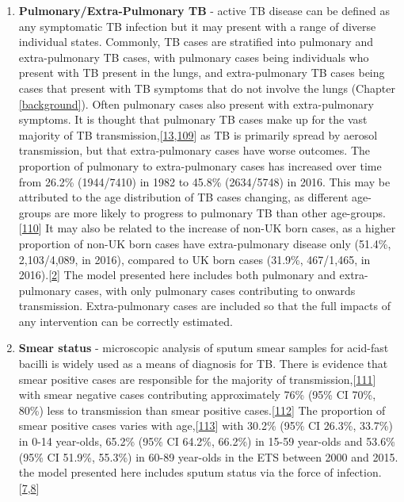 \documentclass[11pt,twoside]{bristolthesis}
\begin{document}
  \begin{enumerate}
  \def\labelenumi{\arabic{enumi}.}
  \item
    \textbf{Pulmonary/Extra-Pulmonary TB} - active TB disease can be defined as any symptomatic TB infection but it may present with a range of diverse individual states. Commonly, TB cases are stratified into pulmonary and extra-pulmonary TB cases, with pulmonary cases being individuals who present with TB present in the lungs, and extra-pulmonary TB cases being cases that present with TB symptoms that do not involve the lungs (Chapter \ref{background}). Often pulmonary cases also present with extra-pulmonary symptoms. It is thought that pulmonary TB cases make up for the vast majority of TB transmission,{[}\protect\hyperlink{ref-Sepkowitz1996}{13},\protect\hyperlink{ref-Mathema2018}{109}{]} as TB is primarily spread by aerosol transmission, but that extra-pulmonary cases have worse outcomes. The proportion of pulmonary to extra-pulmonary cases has increased over time from 26.2\% (1944/7410) in 1982 to 45.8\% (2634/5748) in 2016. This may be attributed to the age distribution of TB cases changing, as different age-groups are more likely to progress to pulmonary TB than other age-groups.{[}\protect\hyperlink{ref-Lefebvre2017}{110}{]} It may also be related to the increase of non-UK born cases, as a higher proportion of non-UK born cases have extra-pulmonary disease only (51.4\%, 2,103/4,089, in 2016), compared to UK born cases (31.9\%, 467/1,465, in 2016).{[}\protect\hyperlink{ref-PHE2017}{2}{]} The model presented here includes both pulmonary and extra-pulmonary cases, with only pulmonary cases contributing to onwards transmission. Extra-pulmonary cases are included so that the full impacts of any intervention can be correctly estimated.
  \item
    \textbf{Smear status} - microscopic analysis of sputum smear samples for acid-fast bacilli is widely used as a means of diagnosis for TB. There is evidence that smear positive cases are responsible for the majority of transmission,{[}\protect\hyperlink{ref-PMID:13148535}{111}{]} with smear negative cases contributing approximately 76\% (95\% CI 70\%, 80\%) less to transmission than smear positive cases.{[}\protect\hyperlink{ref-Tostmann2008}{112}{]} The proportion of smear positive cases varies with age,{[}\protect\hyperlink{ref-Piccini2014}{113}{]} with 30.2\% (95\% CI 26.3\%, 33.7\%) in 0-14 year-olds, 65.2\% (95\% CI 64.2\%, 66.2\%) in 15-59 year-olds and 53.6\% (95\% CI 51.9\%, 55.3\%) in 60-89 year-olds in the ETS between 2000 and 2015. the model presented here includes sputum status via the force of infection.{[}\protect\hyperlink{ref-Anderson1991}{7},\protect\hyperlink{ref-Keeling2007}{8}{]}

\end{enumerate}
\end{document}
